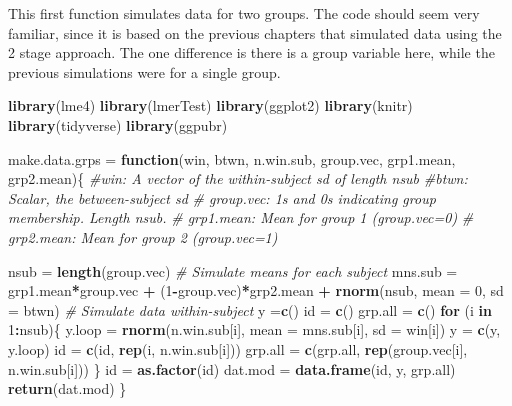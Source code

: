 \documentclass[
]{book}
\newenvironment{Shaded}{\begin{snugshade}}{\end{snugshade}}
\newcommand{\CommentTok}[1]{\textcolor[rgb]{0.56,0.35,0.01}{\textit{#1}}}
\newcommand{\ControlFlowTok}[1]{\textcolor[rgb]{0.13,0.29,0.53}{\textbf{#1}}}
\newcommand{\DataTypeTok}[1]{\textcolor[rgb]{0.13,0.29,0.53}{#1}}
\newcommand{\DecValTok}[1]{\textcolor[rgb]{0.00,0.00,0.81}{#1}}
\newcommand{\KeywordTok}[1]{\textcolor[rgb]{0.13,0.29,0.53}{\textbf{#1}}}
\newcommand{\NormalTok}[1]{#1}
\newcommand{\OperatorTok}[1]{\textcolor[rgb]{0.81,0.36,0.00}{\textbf{#1}}}
\newcommand{\StringTok}[1]{\textcolor[rgb]{0.31,0.60,0.02}{#1}}
\begin{document}
This first function simulates data for two groups. The code should seem very familiar, since it is based on the previous chapters that simulated data using the 2 stage approach. The one difference is there is a group variable here, while the previous simulations were for a single group.

\begin{Shaded}
\begin{Highlighting}[]
\KeywordTok{library}\NormalTok{(lme4)}
\KeywordTok{library}\NormalTok{(lmerTest)}
\KeywordTok{library}\NormalTok{(ggplot2)}
\KeywordTok{library}\NormalTok{(knitr)}
\KeywordTok{library}\NormalTok{(tidyverse)}
\KeywordTok{library}\NormalTok{(ggpubr)}

\NormalTok{make.data.grps =}\StringTok{ }\ControlFlowTok{function}\NormalTok{(win, btwn, n.win.sub, group.vec, grp1.mean, grp2.mean)\{}
  \CommentTok{\#win:  A vector of the within{-}subject sd of length nsub}
  \CommentTok{\#btwn: Scalar, the between{-}subject sd}
  \CommentTok{\# group.vec: 1\textquotesingle{}s and 0\textquotesingle{}s indicating group membership.  Length nsub.}
  \CommentTok{\# grp1.mean:  Mean for group 1 (group.vec=0)}
  \CommentTok{\# grp2.mean:  Mean for group 2 (group.vec=1)}
  
\NormalTok{  nsub =}\StringTok{ }\KeywordTok{length}\NormalTok{(group.vec)}
  \CommentTok{\# Simulate means for each subject}
\NormalTok{  mns.sub =}\StringTok{ }\NormalTok{grp1.mean}\OperatorTok{*}\NormalTok{group.vec }\OperatorTok{+}\StringTok{ }\NormalTok{(}\DecValTok{1}\OperatorTok{{-}}\NormalTok{group.vec)}\OperatorTok{*}\NormalTok{grp2.mean }\OperatorTok{+}\StringTok{  }\KeywordTok{rnorm}\NormalTok{(nsub, }\DataTypeTok{mean =} \DecValTok{0}\NormalTok{, }\DataTypeTok{sd =}\NormalTok{ btwn)}
  \CommentTok{\# Simulate data within{-}subject}
\NormalTok{  y =}\KeywordTok{c}\NormalTok{()}
\NormalTok{  id =}\StringTok{ }\KeywordTok{c}\NormalTok{()}
\NormalTok{  grp.all =}\StringTok{ }\KeywordTok{c}\NormalTok{()}
  \ControlFlowTok{for}\NormalTok{ (i }\ControlFlowTok{in} \DecValTok{1}\OperatorTok{:}\NormalTok{nsub)\{}
\NormalTok{    y.loop =}\StringTok{ }\KeywordTok{rnorm}\NormalTok{(n.win.sub[i], }
                   \DataTypeTok{mean =}\NormalTok{ mns.sub[i], }\DataTypeTok{sd =}\NormalTok{ win[i])}
\NormalTok{    y =}\StringTok{ }\KeywordTok{c}\NormalTok{(y, y.loop)}
\NormalTok{    id =}\StringTok{ }\KeywordTok{c}\NormalTok{(id, }\KeywordTok{rep}\NormalTok{(i, n.win.sub[i]))}
\NormalTok{   grp.all =}\StringTok{ }\KeywordTok{c}\NormalTok{(grp.all, }\KeywordTok{rep}\NormalTok{(group.vec[i], n.win.sub[i]))}
\NormalTok{  \}}
\NormalTok{  id =}\StringTok{ }\KeywordTok{as.factor}\NormalTok{(id)}
\NormalTok{  dat.mod =}\StringTok{ }\KeywordTok{data.frame}\NormalTok{(id, y, grp.all)}
  \KeywordTok{return}\NormalTok{(dat.mod)}
\NormalTok{\}}
\end{Highlighting}
\end{Shaded}
\end{document}
